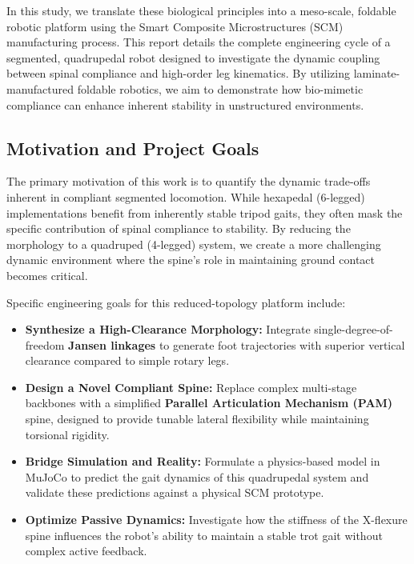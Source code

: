 \documentclass[11pt, a4paper]{article}
\begin{document}
In this study, we translate these biological principles into a meso-scale, foldable robotic platform using the Smart Composite Microstructures (SCM) manufacturing process. This report details the complete engineering cycle of a segmented, quadrupedal robot designed to investigate the dynamic coupling between spinal compliance and high-order leg kinematics. By utilizing laminate-manufactured foldable robotics, we aim to demonstrate how bio-mimetic compliance can enhance inherent stability in unstructured environments.

\subsection{Motivation and Project Goals}
The primary motivation of this work is to quantify the dynamic trade-offs inherent in compliant segmented locomotion. While hexapedal (6-legged) implementations benefit from inherently stable tripod gaits, they often mask the specific contribution of spinal compliance to stability. By reducing the morphology to a quadruped (4-legged) system, we create a more challenging dynamic environment where the spine's role in maintaining ground contact becomes critical.

Specific engineering goals for this reduced-topology platform include:
\begin{itemize}
    \item \textbf{Synthesize a High-Clearance Morphology:} Integrate single-degree-of-freedom \textbf{Jansen linkages} to generate foot trajectories with superior vertical clearance compared to simple rotary legs.
    \item \textbf{Design a Novel Compliant Spine:} Replace complex multi-stage backbones with a simplified \textbf{Parallel Articulation Mechanism (PAM)} spine, designed to provide tunable lateral flexibility while maintaining torsional rigidity.
    \item \textbf{Bridge Simulation and Reality:} Formulate a physics-based model in MuJoCo to predict the gait dynamics of this quadrupedal system and validate these predictions against a physical SCM prototype.
    \item \textbf{Optimize Passive Dynamics:} Investigate how the stiffness of the X-flexure spine influences the robot's ability to maintain a stable trot gait without complex active feedback.
\end{itemize}
\end{document}
